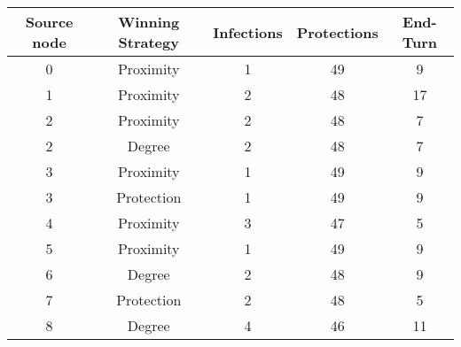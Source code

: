 \documentclass[results.tex]{subfiles}
\begin{document}
    \begin{center}
        \begin{tabular}{| c || c | c | c | c |}
            \hline
            {\bfseries Source node} & {\bfseries Winning Strategy} & {\bfseries Infections} & {\bfseries Protections}
            & {\bfseries End-Turn}
            \\  %
            \hline\hline
            0                       & Proximity                    & 1                      & 49                      & 9                    \\
            \hline
            1                       & Proximity                    & 2                      & 48                      & 17                   \\
            \hline
            2                       & Proximity                    & 2                      & 48                      & 7                    \\
            \hline
            2                       & Degree                       & 2                      & 48                      & 7                    \\
            \hline
            3                       & Proximity                    & 1                      & 49                      & 9                    \\
            \hline
            3                       & Protection                   & 1                      & 49                      & 9                    \\
            \hline
            4                       & Proximity                    & 3                      & 47                      & 5                    \\
            \hline
            5                       & Proximity                    & 1                      & 49                      & 9                    \\
            \hline
            6                       & Degree                       & 2                      & 48                      & 9                    \\
            \hline
            7                       & Protection                   & 2                      & 48                      & 5                    \\
            \hline
            8                       & Degree                       & 4                      & 46                      & 11                   \\

\end{tabular}
\end{center}
\end{document}
